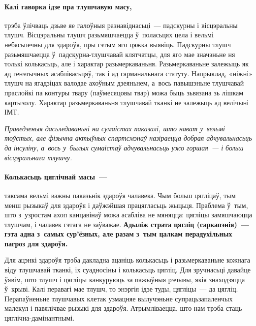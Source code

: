 
\paragraph{Калі гаворка ідзе пра тлушчавую масу,} трэба ўлічваць дзьве яе галоўныя разнавіднасьці~--- падскурны і вісцэральны тлушч. Вісцэральны тлушч разьмяшчаецца ў~поласьцях цела і вельмі небясьпечны для здароўя, пры гэтым яго цяжка выявіць. Падскурны тлушч разьмяшчаецца ў~падскурна-тлушчавай клятчатцы, для яго мае значэньне ня толькі колькасьць, але і характар разьмеркаваньня. Разьмеркаваньне залежыць як ад генэтычных асаблівасьцяў, так і ад гарманальнага статуту. Напрыклад, «ніжні» тлушч на ягадзіцах валодае ахоўным дзеяньнем, а~вось павышэньне тлушчавай праслойкі па контуры твару (паўмесяцовы твар) можа быць зьвязана зь лішкам картызолу. Характар разьмеркаваньня тлушчавай тканкі не залежыць ад велічыні ІМТ.

\emph{Праведзеныя дасьледаваньні на сумаістах паказалі, што нават у~вельмі тоўстых, але фізычна актыўных спартсмэнаў назіраецца добрая адчувальнасьць да інсуліну, а~вось у~былых сумаістаў адчувальнасьць ужо горшая~--- і больш вісцэральнага тлушчу.}

\paragraph{Колькасьць цяглічнай масы~---} таксама вельмі важны паказьнік здароўя чалавека. Чым больш цягліцаў, тым менш рызыкаў для здароўя і даўжэйшая працягласьць жыцьця. Праблема ў~тым, што з~узростам ахоп канцавінаў можа асабліва не мяняцца: цягліцы замяшчаюцца тлушчам, і чалавек гэтага не заўважае. \textbf{Адыліж страта цягліц (саркапэнія)~--- гэта адна з~самых сур'ёзных, але разам з~тым цалкам перадухільных пагроз для здароўя.}

Для ацэнкі здароўя трэба дакладна ацаніць колькасьць і разьмеркаваньне кожнага віду тлушчавай тканкі, іх суадносіны і колькасьць цягліц. Для зручнасьці давайце ўявім, што тлушч і цягліцы канкуруюць за пажыўныя рэчывы, якія знаходзяцца ў~крыві. Калі перавагі мае тлушч, то энэргія ідзе туды, цягліцы~--- да цягліц. Перапаўненьне тлушчавых клетак узмацняе вылучэньне супрацьзапаленчых малекул і павялічвае рызыкі для здароўя. Атрымліваецца, што нам трэба стаць цяглічна-дамінантнымі. 

